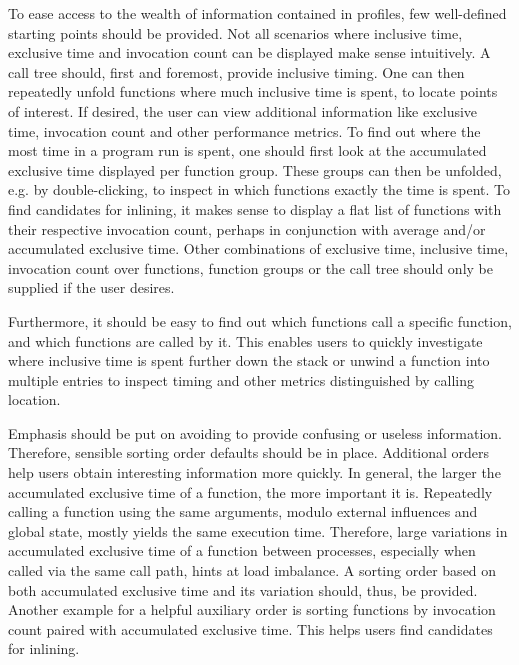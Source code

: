 \documentclass[a4paper, final, diplominf]{zih-template}
\begin{document}
To ease access to the wealth of information contained in profiles, few well-defined starting points should be provided.
Not all scenarios where inclusive time, exclusive time and invocation count can be displayed make sense intuitively.
A call tree should, first and foremost, provide inclusive timing.
One can then repeatedly unfold functions where much inclusive time is spent, to locate points of interest.
If desired, the user can view additional information like exclusive time, invocation count and other performance metrics.
To find out where the most time in a program run is spent, one should first look at the accumulated exclusive time displayed per function group.
These groups can then be unfolded, e.g. by double-clicking, to inspect in which functions exactly the time is spent.
To find candidates for inlining, it makes sense to display a flat list of functions with their respective invocation count, perhaps in conjunction with average and/or accumulated exclusive time.
Other combinations of exclusive time, inclusive time, invocation count over functions, function groups or the call tree should only be supplied if the user desires.

Furthermore, it should be easy to find out which functions call a specific function, and which functions are called by it.
This enables users to quickly investigate where inclusive time is spent further down the stack or unwind a function into multiple entries to inspect timing and other metrics distinguished by calling location.

Emphasis should be put on avoiding to provide confusing or useless information.
Therefore, sensible sorting order defaults should be in place.
Additional orders help users obtain interesting information more quickly.
In general, the larger the accumulated exclusive time of a function, the more important it is.
Repeatedly calling a function using the same arguments, modulo external influences and global state, mostly yields the same execution time.
Therefore, large variations in accumulated exclusive time of a function between processes, especially when called via the same call path, hints at load imbalance.
A sorting order based on both accumulated exclusive time and its variation should, thus, be provided.
Another example for a helpful auxiliary order is sorting functions by invocation count paired with accumulated exclusive time.
This helps users find candidates for inlining.
\end{document}
